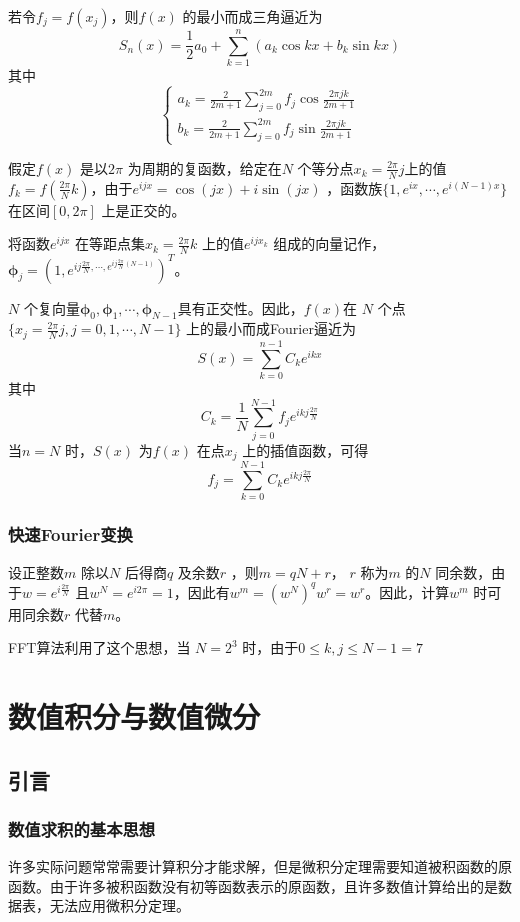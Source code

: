 \documentclass[a4paper]{article}
\begin{document}
若令$f_j = f(x_{j})$，则$f(x)$ 的最小而成三角逼近为
\[
S_n(x) = \frac{1}{2} a_0 + \sum_{k=1}^{n} (a_k \cos kx + b_k \sin kx)
\] 
其中
\[
\begin{cases}
	a_k = \frac{2}{2 m + 1} \sum_{j=0}^{2m} f_j \cos \frac{2 \pi j k}{2 m + 1} \\
	b_k = \frac{2}{2 m + 1} \sum_{j=0}^{2m} f_j \sin \frac{2 \pi j k}{2 m + 1}
\end{cases}
\] 

假定$f(x)$ 是以$2 \pi$ 为周期的复函数，给定在$N$ 个等分点$x_k = \frac{2 \pi}{N} j$上的值$f_k = f(\frac{2 \pi}{N}k)$，由于$e^{ijx} = \cos (jx) + i \sin (jx)$ ，函数族$\{1, e^{ix}, \cdots, e^{i(N-1)x}\} $ 在区间$[0,2 \pi]$ 上是正交的。

将函数$e^{ijx}$ 在等距点集$x_{k} = \frac{2 \pi}{N} k$ 上的值$e^{ijx_{k}}$ 组成的向量记作，$\mathbf{\phi}_j = (1, e^{ij \frac{2 \pi}{N}, \cdots, e^{ij \frac{2 \pi}{N}(N-1)}})^{T}$。

$N$ 个复向量$\mathbf{\phi}_0, \mathbf{\phi}_1, \cdots, \mathbf{\phi}_{N-1}$具有正交性。因此，$f(x)$在 $N$ 个点$\{x_{j} = \frac{2 \pi}{N} j, j = 0,1,\cdots, N-1\} $ 上的最小而成Fourier逼近为
\[
S(x) = \sum_{k=0}^{n-1} C_k e^{ikx}
\] 
其中
\[
C_k = \frac{1}{N} \sum_{j=0}^{N-1} f_j e^{ikj \frac{2 \pi}{N}}
\] 
当$n=N$ 时，$S(x)$ 为$f(x)$ 在点$x_{j}$ 上的插值函数，可得
\[
f_j = \sum_{k=0}^{N-1} C_k e^{ikj \frac{2 \pi}{N}}
\] 

\subsubsection{快速Fourier变换}
设正整数$m$ 除以$N$ 后得商$q$ 及余数$r$ ，则$m = q N + r$， $r$ 称为$m$ 的$N$ 同余数，由于$w=e^{i \frac{2\pi}{N}}$ 且$w^{N} = e^{i 2\pi} = 1$，因此有$w^{m} = (w^{N})^{q}w^{r} = w^{r}$。因此，计算$w^{m}$ 时可用同余数$r$ 代替$m$。

FFT算法利用了这个思想，当 $N=2^3$ 时，由于$0 \le k,j \le N-1 = 7$

\section{数值积分与数值微分}
\subsection{引言}
\subsubsection{数值求积的基本思想}
许多实际问题常常需要计算积分才能求解，但是微积分定理需要知道被积函数的原函数。由于许多被积函数没有初等函数表示的原函数，且许多数值计算给出的是数据表，无法应用微积分定理。
\end{document}
